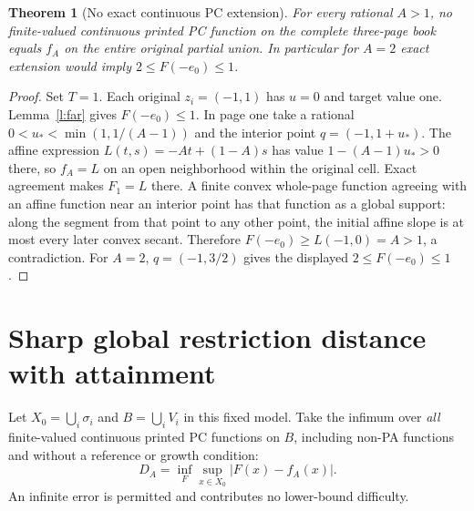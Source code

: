 \documentclass[11pt]{article}
\newtheorem{theorem}{Theorem}[section]
\theoremstyle{definition}\newtheorem{definition}[theorem]{Definition}
\theoremstyle{remark}\newtheorem{remark}[theorem]{Remark}
\begin{document}
\begin{theorem}[No exact continuous PC extension]\label{t:exact}
For every rational $A>1$, no finite-valued continuous printed PC function on the complete three-page book equals $f_A$ on the entire original partial union. In particular for $A=2$ exact extension would imply $2\leq F(-e_0)\leq1$.
\end{theorem}
\begin{proof}
Set $T=1$. Each original $z_i=(-1,1)$ has $u=0$ and target value one. Lemma~\ref{l:far} gives $F(-e_0)\leq1$. In page one take a rational $0<u_*<\min(1,1/(A-1))$ and the interior point $q=(-1,1+u_*)$. The affine expression $L(t,s)=-At+(1-A)s$ has value $1-(A-1)u_*>0$ there, so $f_A=L$ on an open neighborhood within the original cell. Exact agreement makes $F_1=L$ there. A finite convex whole-page function agreeing with an affine function near an interior point has that function as a global support: along the segment from that point to any other point, the initial affine slope is at most every later convex secant. Therefore $F(-e_0)\geq L(-1,0)=A>1$, a contradiction. For $A=2$, $q=(-1,3/2)$ gives the displayed $2\leq F(-e_0)\leq1$.
\end{proof}

\section{Sharp global restriction distance with attainment}\label{s:sharp}
Let $X_0=\bigcup_i\sigma_i$ and $B=\bigcup_i V_i$ in this fixed model. Take the infimum over \emph{all} finite-valued continuous printed PC functions on $B$, including non-PA functions and without a reference or growth condition:
\[
 D_A=\inf_F\sup_{x\in X_0}|F(x)-f_A(x)|.
\]
An infinite error is permitted and contributes no lower-bound difficulty.
\end{document}

